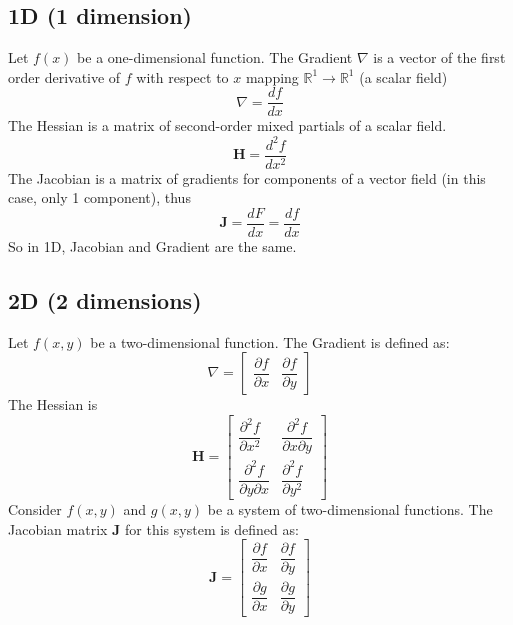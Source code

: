 \documentclass[11pt,a4paper]{book}
\theoremstyle{definition}\newtheorem{definition}{Definition}
\theoremstyle{definition}\newtheorem{fact}{Fact}
\theoremstyle{definition}\newtheorem{remark}{Remark}
\theoremstyle{definition}\newtheorem{ex}{Ex.}
\theoremstyle{definition}\newtheorem{project}{Project}
\theoremstyle{definition}\newtheorem{problem}{Problem}
\theoremstyle{definition}\newtheorem{example}{Example}
\numberwithin{theorem}{section}
\numberwithin{corollary}{chapter}
\numberwithin{assumption}{chapter}
\numberwithin{definition}{chapter}
\numberwithin{prop}{chapter}
\numberwithin{notation}{chapter}
\numberwithin{problem}{chapter}
\numberwithin{example}{chapter}
\numberwithin{fact}{chapter}
\numberwithin{ex}{chapter}
\def\R{\mathbb R}
\def\R{\mathbb R}
\def\H{\mathbf H}
\begin{document}
\begin{appendices}
	\subsection*{1D (1 dimension)}
	Let \( f(x) \) be a one-dimensional function. The Gradient \( \nabla \) is a vector of the first order derivative of \( f \) with respect to \( x \) mapping $\R^1 \to \R^1$ (a scalar field)
	\[
	\nabla = \dfrac{df}{dx}
	\]
	The Hessian is a matrix of second-order mixed partials of a scalar field.
	\[
	\mathbf{H} = \dfrac{d^2f}{dx^2}
	\]	
	The Jacobian is a matrix of gradients for components of a vector field (in this case, only 1 component), thus
	\[
	\mathbf{J} = \dfrac{dF}{dx} = \dfrac{df}{dx}
	\]	
	So in 1D, Jacobian and Gradient are the same.	
	
	\subsection*{2D (2 dimensions)}
	
	Let \( f(x, y) \) be a two-dimensional function. The Gradient is defined as:
	\[
	\nabla =
	\begin{bmatrix}
		\dfrac{\partial f}{\partial x} & \dfrac{\partial f}{\partial y}
	\end{bmatrix}
	\]
	The Hessian is 
	\[
	\H = \begin{bmatrix}
		\dfrac{\partial^2 f}{\partial x^2} & \dfrac{\partial^2 f}{\partial x \partial y} \\
		\dfrac{\partial^2 f}{\partial y \partial x} & \dfrac{\partial^2 f}{\partial y^2}
	\end{bmatrix}
	\]
	Consider \( f(x, y) \) and \( g(x, y) \) be a system of two-dimensional functions. The Jacobian matrix \( \mathbf{J} \) for this system is defined as:
	\[
	\mathbf{J} =
	\begin{bmatrix}
		\dfrac{\partial f}{\partial x} & \dfrac{\partial f}{\partial y} \\
		\dfrac{\partial g}{\partial x} & \dfrac{\partial g}{\partial y}
	\end{bmatrix}
	\]
	

\end{appendices}
\end{document}
